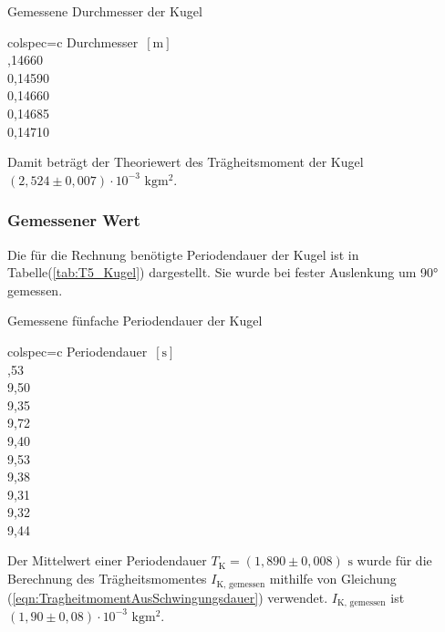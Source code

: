     \begin{table}[H]
      \centering 
      \caption{Gemessene Durchmesser der Kugel}
      \label{tab:Durchmesser_Kugel}
      \begin{tblr}{colspec={c}}
          \toprule
          Durchmesser $\,[\unit{\meter}]$ \\
          ,14660 \\
          0,14590 \\
          0,14660 \\
          0,14685 \\
          0,14710 \\
          \bottomrule
      \end{tblr}
    \end{table}
    Damit beträgt der Theoriewert des Trägheitsmoment der Kugel $(2,524 \pm 0,007) \cdot 10^{-3} \,\,\unit{\kilo\gram\meter\squared}$.

    \subsubsection{Gemessener Wert}
    Die für die Rechnung benötigte Periodendauer der Kugel ist in Tabelle(\ref{tab:T5_Kugel}) dargestellt. 
    Sie wurde bei fester Auslenkung um 90° gemessen.
    \begin{table}[H]
      \centering 
      \caption{Gemessene fünfache Periodendauer der Kugel}
      \label{tab:T5_Kugel}
      \begin{tblr}{colspec={c}}
          \toprule
          Periodendauer $\,[\unit{\second}]$ \\
          ,53 \\
          9,50 \\
          9,35 \\
          9,72 \\
          9,40 \\
          9,53 \\
          9,38 \\
          9,31 \\
          9,32 \\
          9,44 \\
          \bottomrule
      \end{tblr}
    \end{table}
    Der Mittelwert einer Periodendauer $T_{\text{K}} = (1,890 \pm 0,008) \,\,\unit{\second}$ wurde für die Berechnung des 
    Trägheitsmomentes $I_{\text{K, gemessen}}$ mithilfe von Gleichung (\ref{eqn:TragheitmomentAusSchwingungsdauer}) verwendet. 
    $I_{\text{K, gemessen}}$ ist $(1,90 \pm 0,08) \cdot 10^{-3} \,\,\unit{\kilo\gram\meter\squared}$.

